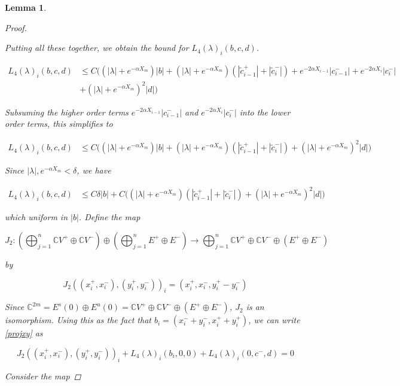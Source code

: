 \documentclass[12pt]{article}
\def\C{{\mathbb C}}
\newtheorem{lemma}{Lemma}
\begin{document}
\begin{lemma}
\begin{proof}
\begin{enumerate}
\end{enumerate}

Putting all these together, we obtain the bound for $L_4(\lambda)_i(b, c, d)$.

\begin{align*}
L_4(\lambda)_i(b, c, d) &\leq 
C\Big( (|\lambda| + e^{-\alpha X_m})|b| 
+ (|\lambda| + e^{-\alpha X_m})(|\tilde{c}_{i-1}^+| + |\tilde{c}_i^-|) + e^{-2\alpha X_{i-1}} |c_{i-1}^-| + e^{-2\alpha X_i} |c_i^-| \\
&+ (|\lambda| + e^{-\alpha X_m})^2 |d| \Big) 
\end{align*}

Subsuming the higher order terms $e^{-2\alpha X_{i-1}} |c_{i-1}^-|$ and $e^{-2\alpha X_i} |c_i^-|$ into the lower order terms, this simplifies to

\begin{align*}
L_4(\lambda)_i(b, c, d) &\leq 
C\Big( (|\lambda| + e^{-\alpha X_m})|b|  
+ (|\lambda| + e^{-\alpha X_m})(|\tilde{c}_{i-1}^+| + |\tilde{c}_i^-|) + (|\lambda| + e^{-\alpha X_m})^2 |d|  \Big) 
\end{align*}

Since $|\lambda|, e^{-\alpha X_m} < \delta$, we have

\begin{align*}
L_4(\lambda)_i(b, c, d) &\leq C \delta |b| 
+ C \Big( (|\lambda| + e^{-\alpha X_m})(|\tilde{c}_{i-1}^+| + |\tilde{c}_i^-|)+ (|\lambda| + e^{-\alpha X_m})^2 |d| \Big) 
\end{align*}

which uniform in $|b|$. Define the map

\[
J_2: \left( \bigoplus_{j=1}^n \C V^+ \oplus \C V^- \right) \oplus
\left( \bigoplus_{j=1}^n E^+ \oplus E^- \right) 
\rightarrow \bigoplus_{j=1}^n \C V^+ \oplus \C V^- \oplus (E^+ \oplus E^-)
\]

by 

\[
J_2( (x_i^+, x_i^-),(y_i^+, y_i^-))_i = ( x_i^+, x_i^-, y_i^+ - y_i^- )
\]

Since $\C^{2m} = E^s(0) \oplus E^u(0) = \C V^+ \oplus \C V^- \oplus (E^+ \oplus E^-)$, $J_2$ is an isomorphism. Using this as the fact that $b_i = (x_i^- + y_i^-, x_i^+ + y_i^+)$, we can write \eqref{projxy} as

\begin{equation}\label{projxy2}
J_2( (x_i^+, x_i^-),(y_i^+, y_i^-))_i 
+ L_4(\lambda)_i(b_i, 0, 0) + L_4(\lambda)_i(0, c^-, d) = 0
\end{equation}

Consider the map


\end{proof}
\end{lemma}
\end{document}
